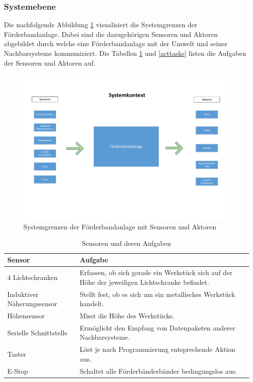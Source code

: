 \documentclass[a4paper, 11pt]{article}
\begin{document}
\newpage

\subsubsection{Systemebene}
Die nachfolgende Abbildung \ref{syskont} visualisiert die Systemgrenzen der Förderbandanlage. Dabei sind die dazugehörigen Sensoren und Aktoren abgebildet durch welche eine Förderbandanlage mit der Umwelt und seiner Nachbarsysteme kommuniziert. Die Tabellen \ref{senstasks} und \ref{acttasks} listen die Aufgaben der Sensoren und Aktoren auf.

\begin{figure}[h]
\hspace{-1.2cm}
\includegraphics[scale=0.6]{images/Systemkontext.pdf}
\caption{Systemgrenzen der Förderbandanlage mit Sensoren und Aktoren}
\label{syskont}
\end{figure}

\begin{table}[h]
\center
\begin{tabularx}{\textwidth}{|l|X|}
\hline
\textbf{Sensor}&\textbf{Aufgabe}\\
\hline
4 Lichtschranken&Erfassen, ob sich gerade ein Werkstück sich auf der Höhe der jeweiligen Lichtschranke befindet.\\
\hline
Induktiver Näherungssensor&Stellt fest, ob es sich um ein metallisches Werkstück handelt.\\
\hline
Höhensensor&Misst die Höhe des Werkstücks.\\
\hline
Serielle Schnittstelle&Ermöglicht den Empfang von Datenpaketen anderer Nachbarsysteme.\\
\hline
Taster&Löst je nach Programmierung entsprechende Aktion aus.\\
\hline
E-Stop&Schaltet alle Förderbänderbänder bedingungslos aus.\\
\hline
\end{tabularx}
\caption{Sensoren und deren Aufgaben}
\label{senstasks}
\end{table}
\end{document}
